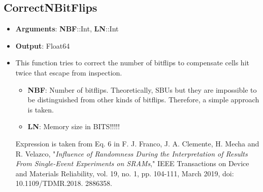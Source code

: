 \subsection*{CorrectNBitFlips}
%
	\begin{itemize}
		\item \textbf{Arguments}: \textbf{NBF}::Int, \textbf{LN}::Int
		\item \textbf{Output}: Float64
		\item This function tries to correct the number of bitflips to compensate cells hit twice that
		escape from inspection. 
		\begin{itemize}
			\item \textbf{NBF}: Number of bitflips. Theoretically, SBUs but they are impossible to be distinguished 
			from other kinds of bitflips. Therefore, a simple approach is taken.
			\item \textbf{LN}: Memory size in BITS!!!!!
		\end{itemize}	 
		 Expression is taken from Eq. 6 in F. J. Franco, J. A. Clemente, H. Mecha and R. Velazco, 
		 "\textit{Influence of Randomness During the Interpretation of Results From Single-Event Experiments 
		 on SRAMs}," IEEE Transactions on Device and Materials Reliability, vol. 19, no. 1, pp. 104-111, 
		 March 2019, doi: 10.1109/TDMR.2018.
		 2886358.		
	\end{itemize}
%
